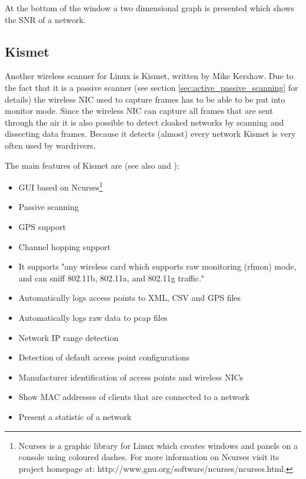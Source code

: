 At the bottom of the window a two dimensional graph is presented which shows the SNR of a network.

\subsection*{Kismet}

Another wireless scanner for Linux is Kismet, written by Mike Kershaw. Due to the fact that it is a passive scanner (see section \ref{sec:active_passive_scanning} for details) the wireless NIC used to capture frames has to be able to be put into monitor mode. Since the wireless NIC can capture all frames that are sent through the air it is also possible to detect cloaked networks by scanning and dissecting data frames. Because it detects (almost) every network Kismet is very often used by wardrivers.

The main features of Kismet are (see also \cite{kismet_readme} and \cite{guide_to_wardriving}):

\begin{itemize}
	\addtolength{\itemsep}{-1.5ex}

	\item GUI based on Ncurses\footnote{Ncurses is a graphic library for Linux which creates windows and panels on a console using coloured dashes. For more information on Ncurses visit its project homepage at: http://www.gnu.org/software/ncurses/ncurses.html.}
    \item Passive scanning
	\item GPS support
	\item Channel hopping support
	\item It supports "any wireless card which
    supports raw monitoring (rfmon) mode, and can sniff 802.11b, 802.11a, and
    802.11g traffic." \cite{kismet_readme}
	\item Automatically logs access points to XML, CSV and GPS files
	\item Automatically logs raw data to pcap files
	\item Network IP range detection
	\item Detection of default access point configurations
	\item Manufacturer identification of access points and wireless NICs
	\item Show MAC addresses of clients that are connected to a network
	\item Present a statistic of a network
\end{itemize}

